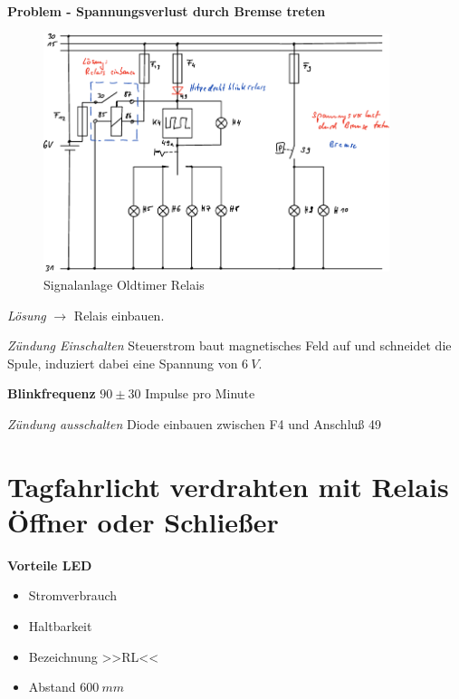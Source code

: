 \textbf{Problem - Spannungsverlust durch Bremse treten}

\begin{figure}[!ht]%
\centering
\includegraphics[width=0.9\textwidth]{images/Skizze/29_FT_Signalanlage_Relais_6V.pdf}
\caption{Signalanlage Oldtimer Relais}
\end{figure}

\emph{Lösung} $\to$ Relais einbauen.

\emph{Zündung Einschalten} Steuerstrom baut magnetisches Feld auf und
schneidet die Spule, induziert dabei eine Spannung von $6~V$.

\textbf{Blinkfrequenz} $90 \pm30$ Impulse pro Minute

\emph{Zündung ausschalten} Diode einbauen zwischen F4 und Anschluß 49

\newpage

\section{Tagfahrlicht verdrahten mit Relais Öffner oder
Schließer}\label{tagfahrlicht-verdrahten-mit-relais-oeffner-oder-schliesser}

\textbf{Vorteile LED}

\begin{itemize}
\item
  Stromverbrauch
\item
  Haltbarkeit
\item
  Bezeichnung >>RL<<
\item
  Abstand $600~mm$
\end{itemize}

